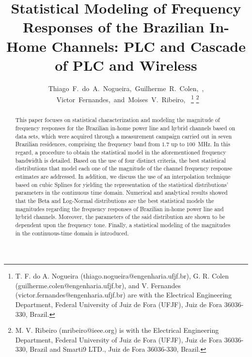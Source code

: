 \documentclass[journal]{IEEEtran}
\begin{document}
\title{Statistical Modeling of Frequency Responses of the Brazilian In-Home Channels: PLC and Cascade of PLC and Wireless}

\author{Thiago~F.~do~A.~Nogueira,~Guilherme~R.~Colen,~,
	~Victor~Fernandes,~and~Moises~V.~Ribeiro,~
\thanks{T. F. do A. Nogueira (thiago.nogueira@engenharia.ufjf.br), G. R. Colen (guilherme.colen@engenharia.ufjf.br), and V. Fernandes (victor.fernandes@engenharia.ufjf.br) are with the Electrical Engineering Department, Federal University of Juiz	de Fora (UFJF), Juiz de Fora 36036-330, Brazil.}
\thanks{M. V. Ribeiro (mribeiro@ieee.org) is with the Electrical Engineering
	Department, Federal University of Juiz de Fora (UFJF), Juiz de Fora 36036-330, Brazil and Smarti9 LTD., Juiz de Fora 36036-330, Brazil.}}


\maketitle

\begin{abstract}
This paper focuses on statistical characterization and modeling the magnitude of frequency responses for the Brazilian in-home power line and hybrid channels based on data sets, which were acquired through a measurement campaign carried out in seven Brazilian residences, comprising the frequency band from $1.7$ up to $100$~MHz. In this regard, a procedure to obtain the statistical model in the aforementioned frequency bandwidth is detailed. Based on the use of four distinct criteria, the best statistical distributions that model each one of the magnitude of the channel frequency response estimates are addressed. In addition, we discuss the use of an interpolation technique based on cubic Splines for yielding the representation of the statistical distributions' parameters in the continuous time domain. Numerical and analytical results showed that the Beta and Log-Normal distributions are the best statistical models the magnitudes regarding the frequency responses of Brazilian in-home power line and hybrid channels. Moreover, the parameters of the said distribution are shown to be dependent upon the frequency tone. Finally, a statistical modeling of the magnitudes in the continuous-time domain is introduced.  

\end{abstract}
\end{document}
